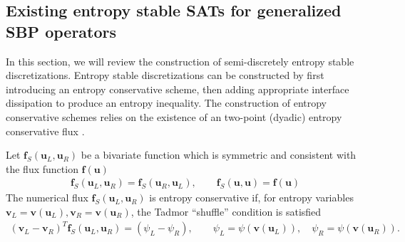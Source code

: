 \documentclass[review,onefignum,onetabnum,final]{siamart171218}
\newcommand{\pd}[2]{\frac{\partial#1}{\partial#2}}
\newcommand{\LRp}[1]{\left( #1 \right)}
\newcommand{\LRl}[1]{\left. #1 \right|}
\newcommand{\diag}[1]{{\rm diag}\LRp{#1}}
\begin{document}
%


\subsection{Existing entropy stable SATs for generalized SBP operators}
\label{sec:gsbpsat}

In this section, we will review the construction of semi-discretely entropy stable discretizations.  Entropy stable discretizations can be constructed by first introducing an entropy conservative scheme, then adding appropriate interface dissipation to produce an entropy inequality.  The construction of entropy conservative schemes relies on the existence of an two-point (dyadic) entropy conservative flux \cite{tadmor1987numerical}.  
\begin{definition}
\label{def:tadmor}
Let $\bm{f}_S(\bm{u}_L,\bm{u}_R)$ be a bivariate function which is symmetric and consistent with the flux function $\bm{f}(\bm{u})$
\begin{align*}
\bm{f}_S(\bm{u}_L,\bm{u}_R) = \bm{f}_S(\bm{u}_R,\bm{u}_L), \qquad \bm{f}_S(\bm{u},\bm{u}) = \bm{f}(\bm{u})
\end{align*}
The numerical flux $\bm{f}_S(\bm{u}_L, \bm{u}_R)$ is entropy conservative if, for entropy variables $\bm{v}_L = \bm{v}(\bm{u}_L), \bm{v}_R = \bm{v}(\bm{u}_R)$, the Tadmor ``shuffle'' condition is satisfied
\begin{align*}
\LRp{\bm{v}_L - \bm{v}_R}^T \bm{f}_S(\bm{u}_L,\bm{u}_R) = (\psi_L - \psi_R), \qquad \psi_L = \psi(\bm{v}(\bm{u}_L)), \quad \psi_R = \psi(\bm{v}(\bm{u}_R)).  
\end{align*}
\end{definition}
\end{document}

